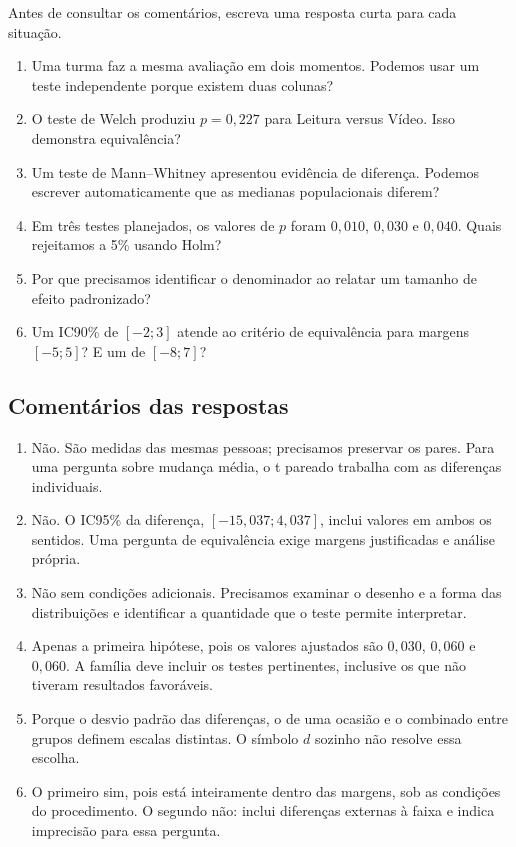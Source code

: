 Antes de consultar os comentários, escreva uma resposta curta para cada situação.

\begin{enumerate}
  \item Uma turma faz a mesma avaliação em dois momentos. Podemos usar um teste independente porque existem duas colunas?
  \item O teste de Welch produziu $p=0{,}227$ para Leitura versus Vídeo. Isso demonstra equivalência?
  \item Um teste de Mann--Whitney apresentou evidência de diferença. Podemos escrever automaticamente que as medianas populacionais diferem?
  \item Em três testes planejados, os valores de $p$ foram $0{,}010$, $0{,}030$ e $0{,}040$. Quais rejeitamos a 5\% usando Holm?
  \item Por que precisamos identificar o denominador ao relatar um tamanho de efeito padronizado?
  \item Um IC90\% de $[-2;3]$ atende ao critério de equivalência para margens $[-5;5]$? E um de $[-8;7]$?
\end{enumerate}

\subsection*{Comentários das respostas}

\begin{enumerate}
  \item Não. São medidas das mesmas pessoas; precisamos preservar os pares. Para uma pergunta sobre mudança média, o t pareado trabalha com as diferenças individuais.
  \item Não. O IC95\% da diferença, $[-15{,}037;4{,}037]$, inclui valores em ambos os sentidos. Uma pergunta de equivalência exige margens justificadas e análise própria.
  \item Não sem condições adicionais. Precisamos examinar o desenho e a forma das distribuições e identificar a quantidade que o teste permite interpretar.
  \item Apenas a primeira hipótese, pois os valores ajustados são $0{,}030$, $0{,}060$ e $0{,}060$. A família deve incluir os testes pertinentes, inclusive os que não tiveram resultados favoráveis.
  \item Porque o desvio padrão das diferenças, o de uma ocasião e o combinado entre grupos definem escalas distintas. O símbolo $d$ sozinho não resolve essa escolha.
  \item O primeiro sim, pois está inteiramente dentro das margens, sob as condições do procedimento. O segundo não: inclui diferenças externas à faixa e indica imprecisão para essa pergunta.
\end{enumerate}

